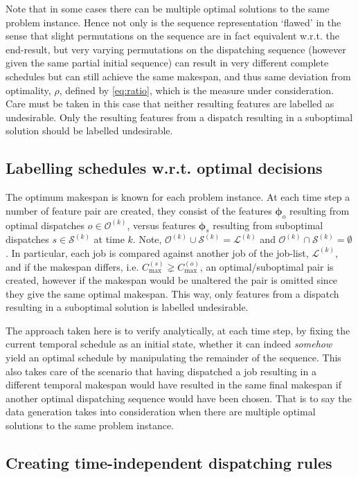 \documentclass[smallextended]{svjour3}
\renewcommand{\vphi}{\bm \phi}
\begin{document}
Note that in some cases there can be multiple optimal solutions to the same 
problem instance. Hence not only is the sequence representation `flawed' in the 
sense that slight permutations on the sequence are in fact equivalent w.r.t. 
the end-result, but very varying permutations on the dispatching sequence 
(however given the same partial initial sequence) can result in very different 
complete schedules but can still achieve the same makespan, and thus same 
deviation from optimality, $\rho$, defined by \eqref{eq:ratio}, which is the 
measure under consideration. Care must be taken in this case that neither 
resulting features are labelled as undesirable. Only the resulting features 
from a dispatch resulting in a suboptimal solution should be labelled 
undesirable.

\subsection{Labelling schedules w.r.t. optimal decisions}
The optimum makespan is known for each problem instance. At each time step a 
number of feature pair are created, they consist of the features $\vphi_o$ 
resulting from optimal dispatches $o\in\mathcal{O}^{(k)}$, versus features 
$\vphi_s$ resulting from suboptimal dispatches $s\in\mathcal{S}^{(k)}$ at time 
$k$. Note, $\mathcal{O}^{(k)}\cup\mathcal{S}^{(k)}=\mathcal{L}^{(k)}$ and 
$\mathcal{O}^{(k)}\cap\mathcal{S}^{(k)}=\emptyset$.
In particular, each job is compared against another job of the job-list, 
$\mathcal{L}^{(k)}$, and if the makespan differs, i.e. $C_{\max}^{(s)}\gneq 
C_{\max}^{(o)}$, an optimal/suboptimal pair is created, however if the makespan 
would be unaltered the pair is omitted since they give the same optimal 
makespan. This way, only features from a dispatch resulting in a suboptimal 
solution is labelled undesirable.

The approach taken here is to verify analytically, at each time step, by fixing 
the current temporal schedule as an initial state, whether it can indeed 
\emph{somehow} yield an optimal schedule by manipulating the remainder of the 
sequence. This also takes care of the scenario that having dispatched a job 
resulting in a different temporal makespan would have resulted in the same 
final makespan if another optimal dispatching sequence would have been chosen. 
That is to say the data generation takes into consideration when there are 
multiple optimal solutions to the same problem instance. 

\subsection{Creating time-independent dispatching 
rules}\label{sec:ord:timeindependent}
\end{document}
